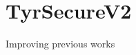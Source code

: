 \chapter{Tyr\+Secure\+V2 }
\hypertarget{index}{}\label{index}
\label{index_md__2home_2eske_2Documents_2git_2TyrSecureV2_2README}%
%


Improving previous works 
